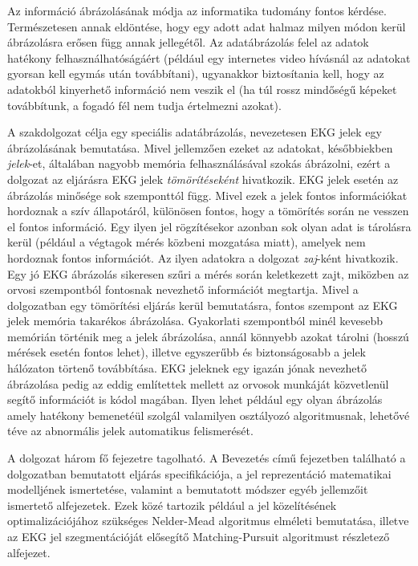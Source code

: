 \documentclass[oneside,titlepage,12pt,a4paper]{report}
\begin{document}
\par
Az információ ábrázolásának módja az informatika tudomány fontos kérdése. Természetesen annak eldöntése, hogy egy adott adat halmaz milyen módon kerül ábrázolásra erősen függ annak jellegétől. Az adatábrázolás felel az adatok hatékony felhasználhatóságáért (például egy internetes video hívásnál az adatokat gyorsan kell egymás után továbbítani), ugyanakkor biztosítania kell, hogy az adatokból kinyerhető információ nem veszik el (ha túl rossz mindőségű képeket továbbítunk, a fogadó fél nem tudja értelmezni azokat). 
\par	A szakdolgozat célja egy speciális adatábrázolás, nevezetesen EKG jelek egy ábrázolásának bemutatása. Mivel jellemzően ezeket az adatokat, későbbiekben \textit{jelek}-et, általában nagyobb memória felhasználásával szokás ábrázolni, ezért a dolgozat az eljárásra EKG jelek \textit{tömörítéseként} hivatkozik. EKG jelek esetén az ábrázolás minősége sok szemponttól függ. Mivel ezek a jelek fontos információkat hordoznak a szív állapotáról, különösen fontos, hogy a tömörítés során ne vesszen el fontos információ. Egy ilyen jel rögzítésekor azonban sok olyan adat is tárolásra kerül (például a végtagok mérés közbeni mozgatása miatt), amelyek nem hordoznak fontos információt. Az ilyen adatokra a dolgozat \textit{zaj}-ként hivatkozik. Egy jó EKG ábrázolás sikeresen szűri a mérés során keletkezett zajt, miközben az orvosi szempontból fontosnak nevezhető információt megtartja. Mivel a dolgozatban egy tömörítési eljárás kerül bemutatásra, fontos szempont az EKG jelek memória takarékos ábrázolása. Gyakorlati szempontból minél kevesebb memórián történik meg a jelek ábrázolása, annál könnyebb azokat tárolni (hosszú mérések esetén fontos lehet), illetve egyszerűbb és biztonságosabb a jelek hálózaton törtenő továbbítása. EKG jeleknek egy igazán jónak nevezhető ábrázolása pedig az eddig említettek mellett az orvosok munkáját közvetlenül segítő információt is kódol magában. Ilyen lehet például egy olyan ábrázolás amely hatékony bemenetéül szolgál valamilyen osztályozó algoritmusnak, lehetővé téve az abnormális jelek automatikus felismerését. 
	\par A dolgozat három fő fejezetre tagolható. A Bevezetés című fejezetben található a dolgozatban bemutatott eljárás specifikációja, a jel reprezentáció matematikai modelljének ismertetése, valamint a bemutatott módszer egyéb jellemzőit ismertető alfejezetek. Ezek közé tartozik például a jel közelítésének optimalizációjához szükséges Nelder-Mead algoritmus elméleti bemutatása, illetve az EKG jel szegmentációját elősegítő Matching-Pursuit algoritmust részletező alfejezet. 
\end{document}
